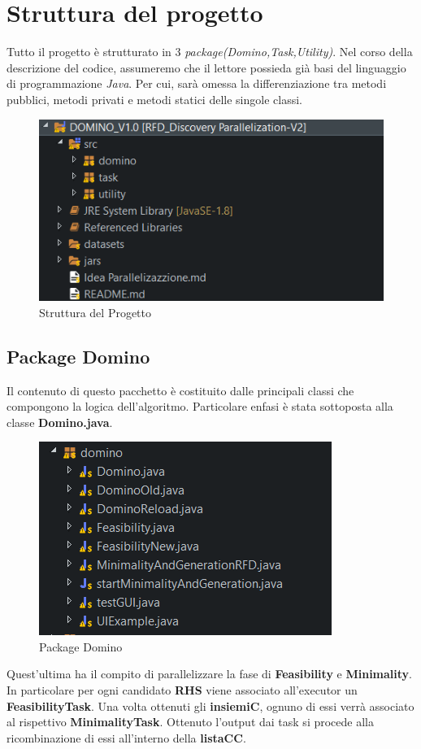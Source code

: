 \section{Struttura del progetto}
Tutto il progetto è strutturato in 3 \emph{package(Domino,Task,Utility)}.
Nel corso della descrizione del codice, assumeremo che il lettore possieda già basi del linguaggio di programmazione \emph{Java}. Per cui, sarà omessa la differenziazione tra metodi pubblici, metodi privati e metodi statici delle singole classi.

\begin{figure}[H]
	\centering
	\includegraphics{Immagini/StrutturaProgetto.png}
	\caption{Struttura del Progetto}
	\label{fig:StrutturaProgetto}
\end{figure}

\subsection{Package Domino}
Il contenuto di questo pacchetto è costituito dalle principali classi che compongono la logica dell'algoritmo. Particolare enfasi è stata sottoposta alla classe \textbf{Domino.java}.
\begin{figure}[H]
	\centering
	\includegraphics{Immagini/PackageRFD.png}
	\caption{Package Domino}
	\label{fig:Package Domino}
\end{figure}
Quest'ultima ha il compito di parallelizzare la fase di \textbf{Feasibility} e \textbf{Minimality}.
In particolare per ogni candidato \textbf{RHS} viene associato all'executor un \textbf{FeasibilityTask}.
Una volta ottenuti gli \textbf{insiemiC}, ognuno di essi verrà associato al rispettivo \textbf{MinimalityTask}. Ottenuto l'output dai task si procede alla ricombinazione di essi all'interno della \textbf{listaCC}.

